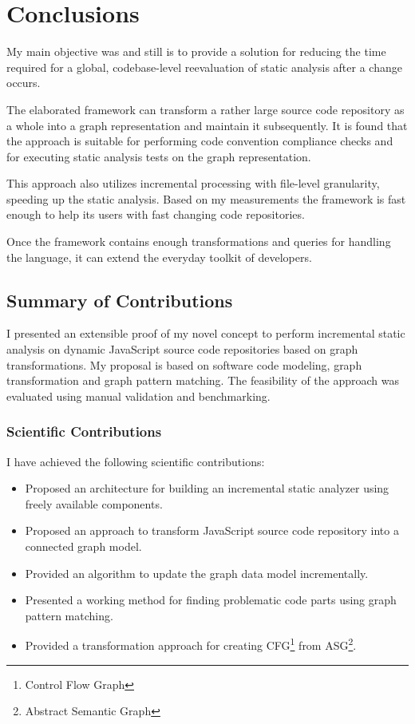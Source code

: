 \chapter{Conclusions}
\label{chap:conclusions}

My main objective was and still is to provide a solution for reducing the time required for a global, codebase-level reevaluation of static analysis after a change occurs.

The elaborated framework can transform a rather large source code repository as a whole into a graph representation and maintain it subsequently. It is found that the approach is suitable for performing code convention compliance checks and for executing static analysis tests on the graph representation.

This approach also utilizes incremental processing with file-level granularity, speeding up the static analysis. Based on my measurements the framework is fast enough to help its users with fast changing code repositories.

Once the framework contains enough transformations and queries for handling the language, it can extend the everyday toolkit of developers.

\section{Summary of Contributions}
I presented an extensible proof of my novel concept to perform incremental static analysis on dynamic JavaScript source code repositories based on graph transformations. My proposal is based on software code modeling, graph transformation and graph pattern matching. The feasibility of the approach was evaluated using manual validation and benchmarking.

\subsection{Scientific Contributions}
I have achieved the following scientific contributions:

\begin{itemize}[topsep=0pt]
	\item Proposed an architecture for building an incremental static analyzer using freely available components.
	\item Proposed an approach to transform JavaScript source code repository into a connected graph model.
	\item Provided an algorithm to update the graph data model incrementally.
	\item Presented a working method for finding problematic code parts using graph pattern matching.
	\item Provided a transformation approach for creating CFG\footnote{Control Flow Graph} from ASG\footnote{Abstract Semantic Graph}.
\end{itemize}


